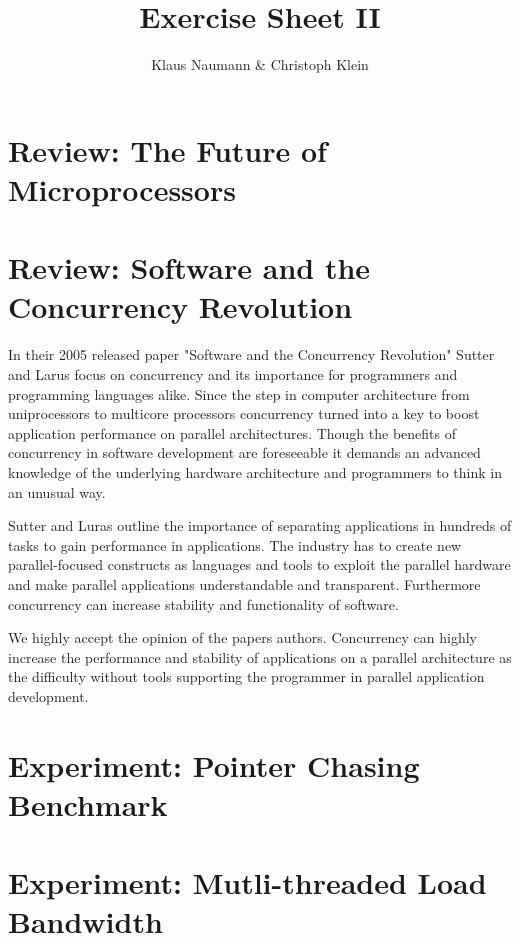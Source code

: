 \documentclass[DIV=12,oneside,a4paper]{scrartcl}
\begin{document}

\title{Exercise Sheet II}
\subject{Advanced Parallel Computing}
\author{Klaus Naumann \& Christoph Klein}
\maketitle




\section{Review: The Future of Microprocessors}

\section{Review: Software and the Concurrency Revolution}
In their 2005 released paper "Software and the Concurrency Revolution" Sutter 
and Larus focus on concurrency and its importance for programmers and 
programming languages alike. Since the step in computer architecture from 
uniprocessors to multicore processors concurrency turned into a key to boost 
application performance on parallel architectures. Though the benefits of 
concurrency in software development are foreseeable it demands an advanced 
knowledge of the underlying hardware architecture and programmers to think in 
an unusual way.

Sutter and Luras outline the importance of separating applications in hundreds 
of tasks to gain performance in applications. The industry has to create new 
parallel-focused constructs as languages and tools to exploit the parallel 
hardware and make parallel applications understandable and transparent. 
Furthermore concurrency can increase stability and functionality of software.

We highly accept the opinion of the papers authors. Concurrency can highly 
increase the performance and stability of applications on a parallel architecture
as the difficulty without tools supporting the programmer in parallel application 
development.
      

\section{Experiment: Pointer Chasing Benchmark}




\section{Experiment: Mutli-threaded Load Bandwidth}
\end{document}

